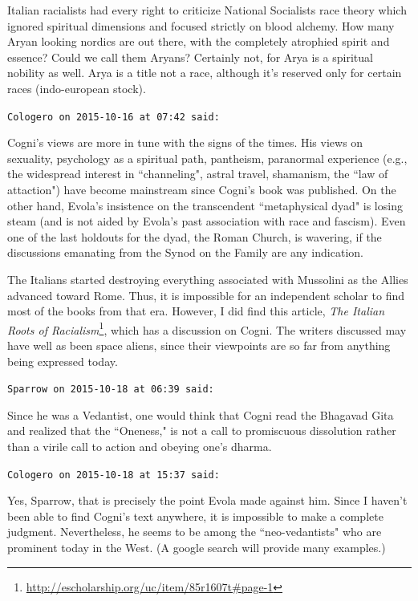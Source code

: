 \begin{footnotesize}
\begin{sffamily}
Italian racialists had every right to criticize National Socialists race theory which ignored spiritual dimensions and focused strictly on blood alchemy. How many Aryan looking nordics are out there, with the completely atrophied spirit and essence? Could we call them Aryans? Certainly not, for Arya is a spiritual nobility as well. Arya is a title not a race, although it's reserved only for certain races (indo-european stock).


\hfill

\texttt{Cologero on 2015-10-16 at 07:42 said: }

Cogni's views are more in tune with the signs of the times. His views on sexuality, psychology as a spiritual path, pantheism, paranormal experience (e.g., the widespread interest in ``channeling", astral travel, shamanism, the ``law of attaction") have become mainstream since Cogni's book was published. On the other hand, Evola's insistence on the transcendent ``metaphysical dyad" is losing steam (and is not aided by Evola's past association with race and fascism). Even one of the last holdouts for the dyad, the Roman Church, is wavering, if the discussions emanating from the Synod on the Family are any indication.

The Italians started destroying everything associated with Mussolini as the Allies advanced toward Rome. Thus, it is impossible for an independent scholar to find most of the books from that era. However, I did find this article, \textit{The Italian Roots of Racialism}\footnote{\url{http://escholarship.org/uc/item/85r1607t\#page-1}}, which has a discussion on Cogni. The writers discussed may have well as been space aliens, since their viewpoints are so far from anything being expressed today.


\hfill

\texttt{Sparrow on 2015-10-18 at 06:39 said: }

Since he was a Vedantist, one would think that Cogni read the Bhagavad Gita and realized that the ``Oneness," is not a call to promiscuous dissolution rather than a virile call to action and obeying one's dharma.


\hfill

\texttt{Cologero on 2015-10-18 at 15:37 said: }

Yes, Sparrow, that is precisely the point Evola made against him. Since I haven't been able to find Cogni's text anywhere, it is impossible to make a complete judgment. Nevertheless, he seems to be among the ``neo-vedantists" who are prominent today in the West. (A google search will provide many examples.)


\end{sffamily}
\end{footnotesize}
